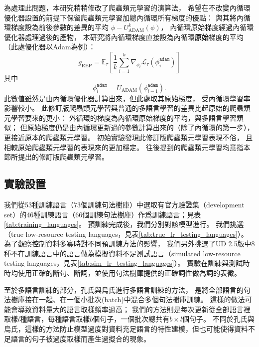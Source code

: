 為處理此問題，本研究稍稍修改了爬蟲類元學習的演算法，
希望在不改變內循環優化器設置的前提下保留爬蟲類元學習加總內循環所有梯度的優點：
與其將內循環梯度設為前後參數的差異的平均 $\phi - U_{\textrm{ADAM}}^{k}(\phi) $，
內循環原始梯度經過內循環優化器處理過後的產物，
本研究將內循環梯度直接設為內循環\textbf{原始}梯度的平均（此處優化器以Adam為例）：
\begin{equation}
    g_{\textrm{REP}} = \mathbb{E}_{\tau}\left[ \frac{1}{k} \sum_{i=1}^{k} \nabla_{\phi_{i}} \mathcal{L}_{\tau} \left( \phi_{i}^{\texttt{adam}} \right) \right]
\end{equation}
其中
\begin{equation}
    \phi_{i}^{\texttt{adam}} = U_{\textrm{ADAM}} \left( \phi_{i - 1}^{\texttt{adam}} \right).
\end{equation}
此數值雖然是由內循環優化器計算出來，但此處取其原始梯度，
受內循環學習率影響較小。
此修訂版爬蟲類元學習與普通的多語言學習的差異比起原始的爬蟲類元學習要來的更小：
外循環的梯度為內循環原始梯度的平均，與多語言學習類似；
但原始梯度仍是由內循環更新過的參數計算出來的（除了內循環的第一步），更接近原本的爬蟲類元學習。
初始實驗發現此修訂版爬蟲類元學習表現不俗，
且相較原始爬蟲類元學習的表現來的更加穩定。
往後提到的爬蟲類元學習均意指本節所提出的修訂版爬蟲類元學習。

\subsection{實驗設置}
\label{subsec:delex_depparse_setting}


我們從53種訓練語言（73個訓練句法樹庫）中選取有官方驗證集（development set）的46種訓練語言（66個訓練句法樹庫）作爲訓練語言；見表\ref{tab:training_languages}。
預訓練完成後，我們分別對該模型進行。
我們挑選（true low-resource testing languages，見表\ref{tab:true_lr_testing_languages}）。
為了觀察控制資料多寡時對不同預訓練方法的影響，
我們另外挑選了UD 2.5版中8種不在訓練語言中的語言做為模擬資料不足測試語言（simulated low-resource testing languages，見表\ref{tab:sim_lr_testing_languages}）。
實驗在訓練與測試時時均使用正確的斷句、斷詞，並使用句法樹庫提供的正確詞性做為詞的表徵。

至於多語言訓練的部分，孔氏\cite{kondratyuk-straka-2019-75}與烏氏\cite{ustun2020udapter}進行多語言訓練的方法，
是將全部語言的句法樹庫接在一起、在一個小批次(batch)中混合多個句法樹庫訓練。
這樣的做法可能會導致資料量大的語言取樣頻率過高；
我們的方法則是每次更新從全部語言裡取樣$l$種語言，每種語言取樣$b$個句子，一個批次總共有$b \times l$個句子。
不同於孔氏與烏氏，這樣的方法防止模型過度對資料充足語言的特性建模，但也可能使得資料不足語言的句子被過度取樣而產生過擬合的現象。

